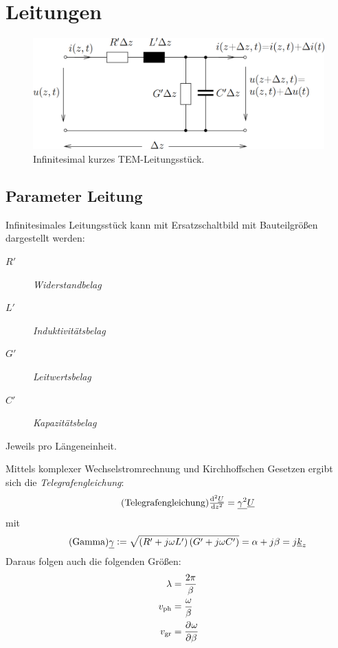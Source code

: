 \chapter{Leitungen}
\begin{figure}[H]
    \centering
    \includegraphics[width=\textwidth]{images/leitung.png}
    \caption{Infinitesimal kurzes TEM-Leitungsstück.}
\end{figure}

\section{Parameter Leitung}
Infinitesimales Leitungsstück kann mit Ersatzschaltbild mit Bauteilgrößen dargestellt werden:
\begin{description}
    \item[$R'$] \emph{Widerstandbelag}
    \item[$L'$] \emph{Induktivitätsbelag}
    \item[$G'$] \emph{Leitwertsbelag}
    \item[$C'$] \emph{Kapazitätsbelag}
\end{description}
Jeweils pro Längeneinheit.

Mittels komplexer Wechselstromrechnung und Kirchhoffschen Gesetzen ergibt sich die \emph{Telegrafengleichung}:
\begin{equation}
    \tag{Telegrafengleichung}
    \od[2]{\UU}{z} = \underline{\gamma^2}\UU
    \label{eqn:Telegraf}
\end{equation}
mit
\begin{equation}
    \tag{Gamma}
    \underline{\gamma} := \sqrt{\left(R'+j\omega L'\right)\left(G'+j\omega C'\right)} = \alpha + j\beta = j\underline{k}_z
    \label{eqn:gamma}
\end{equation}
Daraus folgen auch die folgenden Größen:
\begin{align}
    \lambda     &= \frac{2\pi}{\beta}\\
    v_\text{ph} &= \frac{\omega}{\beta}\\
    v_\text{gr} &= \dpd{\omega}{\beta}
\end{align}

